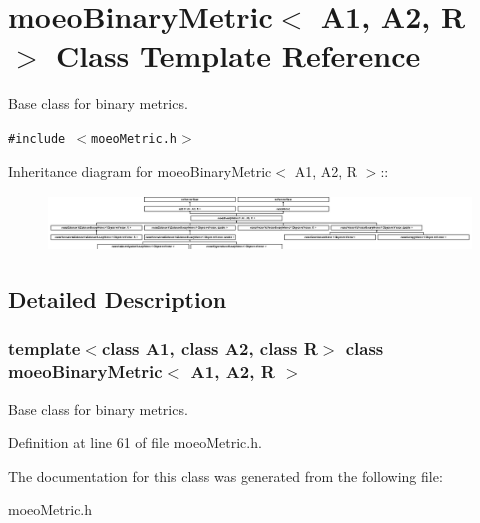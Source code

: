 \section{moeo\-Binary\-Metric$<$ A1, A2, R $>$ Class Template Reference}
\label{classmoeoBinaryMetric}
Base class for binary metrics.  


{\tt \#include $<$moeo\-Metric.h$>$}

Inheritance diagram for moeo\-Binary\-Metric$<$ A1, A2, R $>$::\begin{figure}[H]
\begin{center}
\leavevmode
\includegraphics[height=1.48018cm]{classmoeoBinaryMetric}
\end{center}
\end{figure}


\subsection{Detailed Description}
\subsubsection*{template$<$class A1, class A2, class R$>$ class moeo\-Binary\-Metric$<$ A1, A2, R $>$}

Base class for binary metrics. 



Definition at line 61 of file moeo\-Metric.h.

The documentation for this class was generated from the following file:\begin{CompactItemize}
\item 
moeo\-Metric.h\end{CompactItemize}

